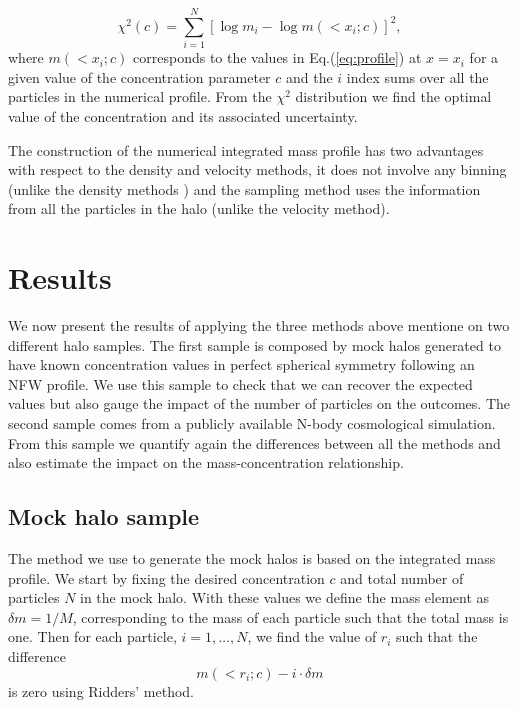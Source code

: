 \documentclass[a4,useAMS,usenatbib,usegraphicx]{mn2e}
\begin{document}
\begin{equation}
\chi^2(c)= \sum_{i=1}^{N}[\log m_i - \log m(< x_i;c)]^2,
\end{equation}
%
where $m(<x_i;c)$ corresponds to the values in Eq.(\ref{eq:profile})
at $x=x_i$ for a given value of the concentration parameter $c$ and
the $i$ index sums over all the particles in the numerical profile.
From the $\chi^2$ distribution we find the optimal value of the
concentration and its associated uncertainty.

The construction of the numerical integrated mass profile has two
advantages with respect to the density and velocity methods, it does
not involve any binning (unlike the density methods ) and the sampling
method uses the information from all the particles in the halo (unlike
the velocity method).


\section{Results}
\label{sec:results}

We now present the results of applying the three methods above
mentione on two different halo samples.  The first sample is composed
by mock halos generated to have known concentration values in perfect
spherical symmetry following an NFW profile.  We use this sample to
check that we can recover the expected values but also gauge the
impact of the number of particles on the outcomes.  The second sample
comes from a publicly available N-body cosmological simulation.  From
this sample we quantify again the differences between all the methods
and also estimate the impact on the mass-concentration relationship.


\subsection{Mock halo sample}

The method we use to generate the mock halos is based on the
integrated mass profile.  We start by fixing the desired concentration
$c$ and total number of particles $N$ in the mock halo.  With these
values we define the mass element as $\delta m = 1/M$, corresponding
to the mass of each particle such that the total mass is one.  Then
for each particle, $i=1,\ldots,N$, we find the value of $r_i$ such
that the difference
%
\begin{equation}
m(<r_i;c) - i \cdot \delta m
\end{equation}
%
is zero using Ridders' method.
\end{document}
